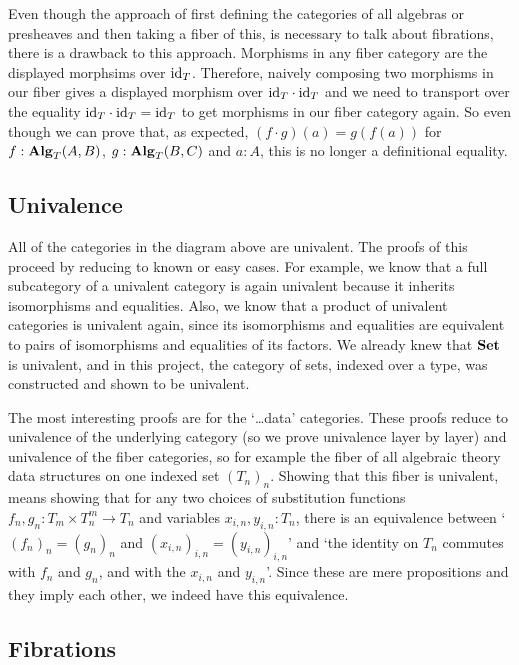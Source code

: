Even though the approach of first defining the categories of all algebras or presheaves and then taking a fiber of this, is necessary to talk about fibrations, there is a drawback to this approach. Morphisms in any fiber category are the displayed morphsims over $ \text{id}_{T} $. Therefore, naively composing two morphisms in our fiber gives a displayed morphism over $ \text{id}_{T} \cdot \text{id}_{T} $ and we need to transport over the equality $ \text{id}_{T} \cdot \text{id}_{T} = \text{id}_{T} $ to get morphisms in our fiber category again. So even though we can prove that, as expected, $ (f \cdot g)(a) = g(f(a)) $ for $ f: \mathbf{Alg}_{T}(A, B) $, $ g: \mathbf{Alg}_{T}(B, C) $ and $ a : A $, this is no longer a definitional equality.

\subsection{Univalence}
All of the categories in the diagram above are univalent. The proofs of this proceed by reducing to known or easy cases. For example, we know that a full subcategory of a univalent category is again univalent because it inherits isomorphisms and equalities. Also, we know that a product of univalent categories is univalent again, since its isomorphisms and equalities are equivalent to pairs of isomorphisms and equalities of its factors. We already knew that $ \mathbf{Set} $ is univalent, and in this project, the category of sets, indexed over a type, was constructed and shown to be univalent.

The most interesting proofs are for the `\dots data' categories. These proofs reduce to univalence of the underlying category (so we prove univalence layer by layer) and univalence of the fiber categories, so for example the fiber of all algebraic theory data structures on one indexed set $ (T_n)_n $. Showing that this fiber is univalent, means showing that for any two choices of substitution functions $ f_n, g_n: T_m \times T_n^m \to T_n $ and variables $ x_{i, n}, y_{i, n} : T_n $, there is an equivalence between `$ (f_n)_n = (g_n)_n $ and $ (x_{i, n})_{i, n} = (y_{i, n})_{i, n} $' and `the identity on $ T_n $ commutes with $ f_n $ and $ g_n $, and with the $ x_{i, n} $ and $ y_{i, n} $'. Since these are mere propositions and they imply each other, we indeed have this equivalence.

\subsection{Fibrations}\label{subsec:fibrations}

